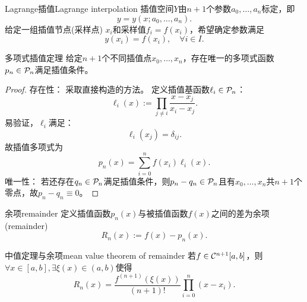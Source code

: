 \begin{definition}
    {Lagrange插值}{Lagrange interpolation}
    插值空间$Y$由$n + 1$个参数$a_0,\ldots,a_n$标定，即
    \[
        y = y(x;a_0,\ldots,a_n).
    \]
    给定一组插值节点(采样点) $x_i$和采样值$f_i = f(x_i)$，希望确定参数满足
    \begin{equation}
        y(x_i) = f(x_i),\quad\forall i \in I.
    \end{equation}
\end{definition}

\begin{theorem}
    {多项式插值定理}{}
    给定$n + 1$个不同插值点$x_0,\ldots,x_n$，存在唯一的多项式函数$p_n \in \mathcal{P}_n$满足插值条件。
\end{theorem}
\begin{proof}
    存在性：
    采取直接构造的方法。
    定义插值基函数$\ell_i \in \mathcal{P}_n$：
    \begin{equation}
        \label{eqn:Lagrange base}
        \ell_i(x) := \prod_{j\neq i}\frac{x - x_j}{x_i - x_j}.
    \end{equation}
    易验证，$\ell_i$满足：
    \begin{equation}
        \ell_i(x_j) = \delta_{ij}.
    \end{equation}
    故插值多项式为
    \begin{equation}
        \label{eqn:Lagrange polynomial}
        p_n(x) = \sum_{i=0}^nf(x_i)\ell_i(x).
    \end{equation}
    唯一性：
    若还存在$q_n \in \mathcal{P}_n$满足插值条件，则$p_n - q_n \in \mathcal{P}_n$且有$x_0,\ldots,x_n$共$n + 1$个零点，故$p_n - q_n \equiv 0$。
\end{proof}

\begin{definition}
    {余项}{remainder}
    定义插值函数$p_n(x)$与被插值函数$f(x)$之间的差为余项(remainder)
    \begin{equation}
        R_n(x) := f(x) - p_n(x).
    \end{equation}
\end{definition}

\begin{theorem}
    {中值定理与余项}{mean value theorem of remainder}
    若$f \in \mathcal{C}^{n+1}[a,b]$，则$\forall x \in [a,b],\exists\xi(x) \in (a,b)$使得
    \begin{equation}
        \label{eqn:Lagrange remainder}
        R_n(x) = \frac{f^{(n+1)}(\xi(x))}{(n + 1)!}\prod_{i=0}^n(x - x_i).
    \end{equation}
\end{theorem}

